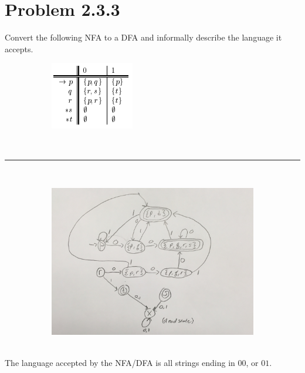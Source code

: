 \documentclass[20pt]{article} %
\begin{document}
\section{Problem 2.3.3}
Convert the following NFA to a DFA and informally describe the language it accepts. 
\begin{figure}[!htbp]
  	\centering
   	\begin{subfigure}[p]{0.25\linewidth}
    	\includegraphics[width=\linewidth]{./figures/HW2fig2.png}
   	\end{subfigure}
\end{figure} \\
\noindent\rule{2cm}{0.4pt} \\
\begin{figure}[!htbp]
  	\centering
   	\begin{subfigure}[p]{0.95\linewidth}
    	\includegraphics[width=\linewidth]{./figures/h2-2.jpg}
   	\end{subfigure}
\end{figure} \\
The language accepted by the NFA/DFA is all strings ending in $00$, or $01$.
\end{document}
